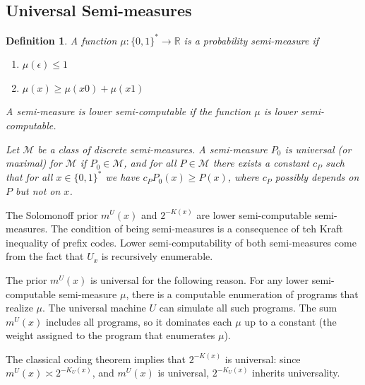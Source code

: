 \documentclass{article}
\newtheorem{definition}[theorem]{Definition}
\newcommand{\bin}{\{0,1\}^*} %
\newcommand{\m}{m^U}
\begin{document}
\subsection{Universal Semi-measures}

\begin{definition}
A function $\mu: \bin \to \mathbb{R}$ is a probability semi-measure if 
\begin{enumerate}
    \item $\mu(\epsilon) \leq 1$
    \item $\mu(x) \geq \mu(x0) + \mu(x1)$
\end{enumerate}
A semi-measure is lower semi-computable if the function $\mu$ is lower semi-computable. 

Let $\mathcal{M}$ be a class of discrete semi-measures. A semi-measure $P_0$ is \emph{universal} (or maximal) for $\mathcal{M}$ if $P_0 \in \mathcal{M}$, and for all $P \in \mathcal{M}$ there exists a constant $c_P$ such that for all $x \in \bin$ we have $c_PP_0(x) \geq P(x)$, where $c_P$ possibly depends on $P$ but not on $x$. 
\end{definition}

The Solomonoff prior $\m(x)$ and $2^{-K(x)}$ are lower semi-computable semi-measures. The condition of being semi-measures is a consequence of teh Kraft inequality of prefix codes. Lower semi-computability of both semi-measures come from the fact that $U_x$ is recursively enumerable. 

The prior $\m(x)$ is universal for the following reason. For any lower semi-computable semi-measure $\mu$, there is a computable enumeration of programs that realize $\mu$. The universal machine $U$ can simulate all such programs. The sum $\m(x)$ includes all programs, so it dominates each $\mu$ up to a constant (the weight assigned to the program that enumerates $\mu$).

The classical coding theorem implies that $2^{-K(x)}$ is universal: since $\m(x) \asymp 2^{-K_U(x)}$, and $\m(x)$ is universal, $2^{-K_U(x)}$ inherits universality.
\end{document}
